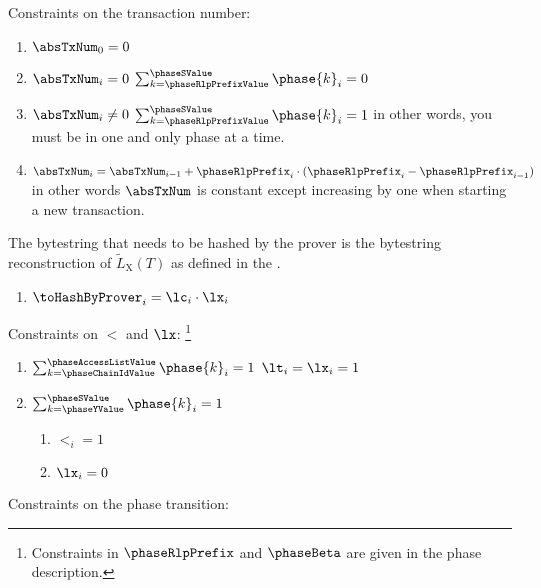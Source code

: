 Constraints on the transaction number:
\begin{enumerate}
    \item $\absTxNum_{0} = 0$
    \item \If $\absTxNum_{i} = 0$ \Then $\sum_{k = \phaseRlpPrefixValue}^{\phaseSValue} \phase{k}_{i} = 0$
    \item \If $\absTxNum_{i} \neq 0$ \Then $\sum_{k = \phaseRlpPrefixValue}^{\phaseSValue} \phase{k}_{i} = 1$ in other words, you must be in one and only phase at a time.
    \item $\absTxNum_{i} = \absTxNum_{i-1} + \phaseRlpPrefix_{i} \cdot (\phaseRlpPrefix_{i}-\phaseRlpPrefix_{i-1})$ in other words $\absTxNum$ is constant except increasing by one when starting a new transaction.
\end{enumerate}
The bytestring that needs to be hashed by the prover is the bytestring reconstruction of $\widetilde{L}_{\mathrm{X}}(T)$ as defined in the \cite{EYP-London}.
\begin{enumerate}[resume]
    \item $\toHashByProver_{i} = \lc_{i} \cdot \lx_{i}$
\end{enumerate}
Constraints on $\lt$ and $\lx$: \footnote{Constraints in $\phaseRlpPrefix $ and $\phaseBeta$ are given in the phase description.}
\begin{enumerate}[resume]
    \item \If $\sum_{k = \phaseChainIdValue}^{\phaseAccessListValue} \phase{k}_{i} = 1$ \Then $\lt_{i} = \lx_{i} = 1$
    \item \If $\sum_{k = \phaseYValue}^{\phaseSValue} \phase{k}_{i} = 1$ \Then 
        \begin{enumerate}
            \item $\lt_{i} = 1$
            \item $\lx_{i} = 0$
        \end{enumerate}
\end{enumerate}
Constraints on the phase transition:
